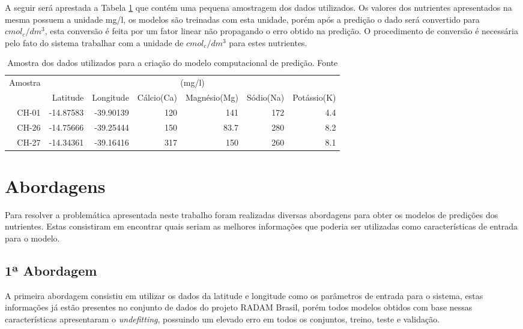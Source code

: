 \documentclass[
12pt,				%
oneside,			%
a4paper,			%
english,			%
french,				%
spanish,			%
brazil				%
]{abntex2}
\begin{document}
A seguir será aprestada a Tabela \ref{tab:dataset} que contém uma pequena amostragem dos dados utilizados. Os valores dos nutrientes apresentados na mesma possuem a unidade mg/l, os modelos são treinadas com esta unidade, porém após a predição o dado será convertido para $cmol_{c}/dm^3$, esta conversão é feita por um fator linear não propagando o erro obtido na predição. O procedimento de conversão é necessária pelo fato do sistema trabalhar com a unidade de $cmol_{c}/dm^3$ para estes nutrientes. 


\begin{table}[h]
	\centering
	\caption{Amostra dos dados utilizados para a criação do modelo computacional de predição. Fonte \cite{limaprojeto}}
	\begin{tabular}{r|r|r|r|r|r|r}
		
		\multirow{2}{*}{Amostra} &\multicolumn{6}{|c}{(mg/l)}
		\\ \cline{2-7}
		& Latitude & Longitude & Cálcio(Ca) & Magnésio(Mg) & Sódio(Na) &Potássio(K)\\ %
		\hline                               %
		CH-01 & -14.87583 & -39.90139 & 120 & 141 & 172 & 4.4 \\
		CH-26 & -14.75666 & -39.25444 & 150 & 83.7 & 280 & 8.2 \\
		CH-27 & -14.34361 & -39.16416 & 317 & 150 & 260 & 8.1 \\
		
	\end{tabular}
	\label{tab:dataset}
\end{table}

\section{Abordagens}

Para resolver a problemática apresentada neste trabalho foram realizadas diversas abordagens para obter os modelos de predições dos nutrientes. Estas consistiram em encontrar quais seriam as melhores informações que poderia ser utilizadas como características de entrada para o modelo. 

\subsection{1ª Abordagem}
A primeira abordagem consistiu em utilizar os dados da latitude e longitude como os parâmetros de entrada para o sistema, estas informações já estão presentes  no conjunto de dados do projeto RADAM Brasil, porém  todos  modelos obtidos com base nessas características apresentaram o \textit{undefitting}, possuindo um elevado erro em todos os conjuntos, treino, teste e validação.
\end{document}
